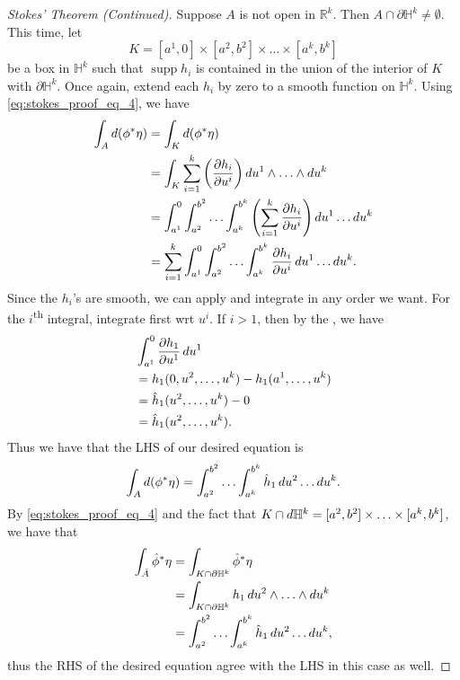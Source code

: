 \documentclass[notoc,notitlepage]{tufte-book}
\DeclareMathOperator{\supp}{supp}
\begin{document}
\begin{proof}[Stokes' Theorem (Continued)]
  \noindent
   Suppose $A$ is not open in $\mathbb{R}^k$. Then $A \cap
  \partial \mathbb{H}^k \neq \emptyset$. This time, let
  \begin{equation*}
    K = [a^1, 0] \times [a^2, b^2] \times \hdots \times [a^k, b^k]
  \end{equation*}
  be a box in $\mathbb{H}^k$ such that $\supp h_i$ is contained in the union of
  the interior of $K$ with $\partial \mathbb{H}^k$. Once again, extend each
  $h_i$ by zero to a smooth function on $\mathbb{H}^k$. Using
  \cref{eq:stokes_proof_eq_4}, we have
  \begin{align*}
    \int_{A} \dif{(\phi^* \eta)}
    &= \int_{K} \dif{(\phi^* \eta)} \\
    &= \int_{K} \sum_{i=1}^{k} \left( \frac{\partial h_i}{\partial u^i} \right)
    \dif{u^1} \land \hdots \land \dif{u^k} \\
    &= \int_{a^1}^{0} \int_{a^2}^{b^2} \hdots \int_{a^k}^{b^k} \left(
    \sum_{i=1}^{k} \frac{\partial h_i}{\partial u^i} \right) \dif{u^1} \hdots
    \dif{u^k} \\
    &= \sum_{i=1}^{k} \int_{a^1}^{0} \int_{a^2}^{b^2} \hdots \int_{a^k}^{b^k}
    \frac{\partial h_i}{\partial u^i} \dif{u^1} \hdots \dif{u^k}.
  \end{align*}
  Since the $h_i$'s are smooth, we can apply  and
  integrate in any order we want. For the $i$\textsuperscript{th} integral,
  integrate first wrt $u^i$. If $i > 1$, then by the , we have
  \begin{align*}
    &\int_{a^1}^{0} \frac{\partial h_1}{\partial u^1} \mathop{}\!d{u^1} \\
    &= h_1(0, u^2, \ldots, u^k) - h_1(a^1, \ldots, u^k) \\
    &= \hat{h}_1(u^2, \ldots, u^k) - 0 \\
    &= \hat{h}_1(u^2, \ldots, u^k).
  \end{align*}
  Thus we have that the LHS of our desired equation is
  \begin{equation*}
    \int_{A} \mathop{}\!d{(\phi^* \eta)} = \int_{a^2}^{b^2} \hdots \int_{a^k}^{b^k}
    \hat{h}_1 \mathop{}\!d{u^2} \hdots \mathop{}\!d{u^k}.
  \end{equation*}
  By \cref{eq:stokes_proof_eq_4} and the fact that $K \cap \mathop{}\!d{\mathbb{H}^k} =
  [a^2, b^2] \times \hdots \times [a^k, b^k]$, we have that
  \begin{align*}
    \int_{\hat{A}} \hat{\phi}^* \eta
    &= \int_{K \cap \partial \mathbb{H}^k} \hat{\phi}^* \eta \\
    &= \int_{K \cap \partial \mathbb{H}^k} h_1 \mathop{}\!d{u^2} \land \hdots \land
    \mathop{}\!d{u^k} \\
    &= \int_{a^2}^{b^2} \hdots \int_{a^k}^{b^k} \hat{h}_1 \mathop{}\!d{u^2} \hdots
    \mathop{}\!d{u^k},
  \end{align*}
  thus the RHS of the desired equation agree with the LHS in this case as well.
\end{proof}
\end{document}
